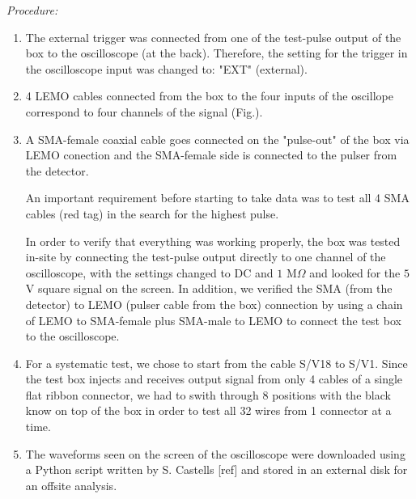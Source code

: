 \textit{Procedure:}\\
\begin{enumerate}
\item The external trigger was connected from one of the test-pulse output of the box to the oscilloscope (at the back). Therefore, the setting for the trigger in the oscilloscope input was changed to: "EXT" (external).

\item 4 LEMO cables connected from the box to the four inputs of the oscillope correspond to four channels of the signal (Fig.).

\item A SMA-female coaxial cable goes connected on the "pulse-out" of the box via LEMO conection and the SMA-female side is connected to the pulser from the detector.

An important requirement before starting to take data was to test all 4 SMA cables (red tag) in the search for the highest pulse.

In order to verify that everything was working properly, the box was tested in-site by connecting the test-pulse output directly to one channel of the oscilloscope, with the settings changed to DC and $1$ M$\Omega $ and looked for the $5$ V square signal on the screen. In addition, we verified the SMA (from the detector) to LEMO (pulser cable from the box) connection by using a chain of LEMO to SMA-female plus SMA-male to LEMO to connect the test box to the oscilloscope.

\item For a systematic test, we chose to start from the cable S/V18 to S/V1. Since the test box injects and receives output signal from only 4 cables of a single flat ribbon connector, we had to swith through 8 positions with the black know on top of the box in order to test all 32 wires from 1 connector at a time. 

\item The waveforms seen on the screen of the oscilloscope were downloaded using a Python script written by S. Castells [ref] and stored in an external disk for an offsite analysis. 



\end{enumerate}
